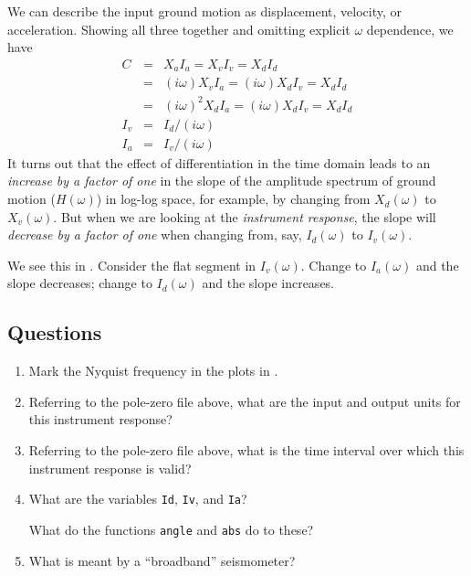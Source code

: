 \documentclass[11pt,titlepage,fleqn]{article}
\begin{document}
\begin{itemize}
We can describe the input ground motion as displacement, velocity, or acceleration. Showing all three together and omitting explicit $\omega$ dependence, we have
%
\begin{eqnarray}
C &=& X_a I_a = X_v I_v =  X_d I_d 
\\
&=& (i\omega) X_v I_a = (i\omega) X_d I_v =  X_d I_d 
\\
&=& (i\omega)^2 X_d I_a = (i\omega) X_d I_v =  X_d I_d 
\\
I_v &=& I_d / (i\omega)
\\
I_a &=& I_v / (i\omega)
\end{eqnarray}
%
It turns out that the effect of differentiation in the time domain leads to an {\em increase by a factor of one} in the slope of the amplitude spectrum of ground motion ($H(\omega)$) in log-log space, for example, by changing from $X_d(\omega)$ to $X_v(\omega)$. But when we are looking at the {\em instrument response}, the slope will {\em decrease by a factor of one} when changing from, say, $I_d(\omega)$ to $I_v(\omega)$.

We see this in . Consider the flat segment in $I_v(\omega)$. Change to $I_a(\omega)$ and the slope decreases; change to $I_d(\omega)$ and the slope increases.

\end{itemize}


\subsection*{Questions}

\begin{enumerate}
\item Mark the Nyquist frequency in the plots in .

\item Referring to the pole-zero file above, what are the input and output units for this instrument response?

\item Referring to the pole-zero file above, what is the time interval over which this instrument response is valid?

\item What are the variables \verb+Id+, \verb+Iv+, and \verb+Ia+?

What do the functions \verb+angle+ and \verb+abs+ do to these?

\item What is meant by a ``broadband'' seismometer?
\end{enumerate}
\end{document}
